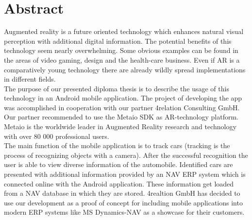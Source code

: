 \chapter*{Abstract}

Augmented reality is a future oriented technology which enhances natural visual perception with additional digital information. The potential benefits of this technology seem nearly overwhelming. Some obvious examples can be found in the areas of video gaming, design and the health-care business. Even if AR is a comparatively young technology there are already wildly spread implementations in different fields.          
\\

The purpose of our presented diploma thesis is to describe the usage of this technology in an Android mobile application. The project of developing the app was accomplished in cooperation with our partner 4relation Consulting GmbH. Our partner recommended to use the Metaio SDK as AR-technology platform. Metaio is the worldwide leader in Augmented Reality research and technology with over 80 000 professional users.
\\

The main function of the mobile application is to track cars (tracking is the process of recognizing objects with a camera). After the successful recognition the user is able to view diverse information of the automobile. Identified cars are presented with additional information provided by an NAV ERP system which is connected online with the Android application. These information get loaded from a NAV database in which they are stored. 4realtion GmbH has decided to use our development as a proof of concept for including mobile applications into modern ERP systems like MS Dynamics-NAV as a showcase for their customers. 